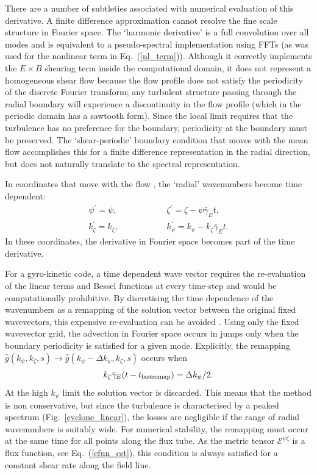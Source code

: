\documentclass{report}
\def\be{\begin{equation}}
\def\ee{\end{equation}}
\def\bee{\begin{eqnarray}}
\def\eee{\end{eqnarray}}
\begin{document}
There are a number of subtleties associated with numerical evaluation of this derivative. A finite difference approximation cannot resolve the fine 
scale structure in Fourier space.  The `harmonic derivative' \cite{Waltz94,Miller94} is a full convolution over all modes and is equivalent to a
pseudo-spectral implementation using FFTs (as was used for the nonlinear term in Eq.~(\ref{nl_term})).  
Although it correctly implements the $E \times B$ shearing term inside the computational domain, it does not represent a homogeneous shear 
flow because the flow profile does not satisfy the periodicity of the discrete Fourier transform; any turbulent structure passing through the radial
boundary will experience a discontinuity in the flow profile (which in the periodic domain has a sawtooth form).  
Since the local limit requires that the turbulence has no preference for the boundary, periodicity at the boundary must be preserved. 
The `shear-periodic' boundary condition \cite{Baron82,Schumann85,Gerz89} that moves with the mean flow accomplishes this for a finite 
difference representation in the radial direction, but does not naturally translate to the spectral representation.

In coordinates that move with the flow  \cite{Rogallo81,Zang88,Pumir96}, the `radial' wavenumbers become time dependent:
\bee
\psi^\prime = \psi , &\qquad& \qquad \zeta^\prime=\zeta-\psi \bar \gamma_E t ,\\
k_\zeta^\prime = k_\zeta , &\qquad& \qquad  k_\psi^\prime = k_\psi - k_\zeta \bar \gamma_E t .
\eee
In these coordinates, the derivative in Fourier space becomes part of the time derivative.

For a gyro-kinetic code, a time dependent wave vector requires the re-evaluation of the linear terms and Bessel functions at every time-step
and would be computationally prohibitive. 
By discretising the time dependence of the wavenumbers as a remapping of the solution vector between the original fixed wavevectors, 
this expensive re-evaluation can be avoided \cite{HammettAPS06}. 
Using only the fixed wavevector grid, the advection in Fourier space occurs in jumps only when the boundary periodicity is satisfied for a 
given mode. 
Explicitly, the remapping $\hat g (k_\psi, k_\zeta,s) \rightarrow \hat g (k_\psi-\Delta k_\psi, k_\zeta,s)$ occurs when
\be
k_\zeta \bar \gamma_E(t-t_{\rm last remap}) = \Delta k_\psi /2 .
\ee
At the high $k_\psi$ limit the solution vector is discarded.  
This means that the method is non conservative, but since the turbulence is characterised by a peaked spectrum 
(Fig.~\ref{cyclone_linear}), the losses are negligible if the range of radial wavenumbers is suitably wide.  
For numerical stability, the remapping must occur at the same time for all points along the flux tube. 
As the metric tensor ${\mathcal E}^{\psi \zeta}$ is a flux function, see Eq.~(\ref{efun_cst}), this condition is always satisfied for a 
constant shear rate along the field line.
\end{document}
